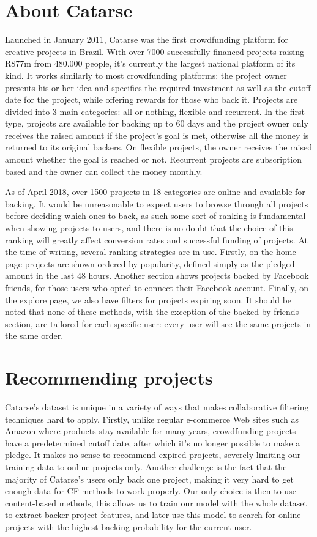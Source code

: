 \documentclass[cic,tc,english]{iiufrgs}
\begin{document}
\chapter{About Catarse}
Launched in January 2011, Catarse was the first crowdfunding platform for creative projects in Brazil. With over 7000 successfully financed projects raising R\$77m from 480.000 people, it's currently the largest national platform of its kind. It works similarly to most crowdfunding platforms: the project owner presents his or her idea and specifies the required investment as well as the cutoff date for the project, while offering rewards for those who back it. Projects are divided into 3 main categories: all-or-nothing, flexible and recurrent. In the first type, projects are available for backing up to 60 days and the project owner only receives the raised amount if the project's goal is met, otherwise all the money is returned to its original backers. On flexible projects, the owner receives the raised amount whether the goal is reached or not. Recurrent projects are subscription based and the owner can collect the money monthly.

As of April 2018, over 1500 projects in 18 categories are online and available for backing. It would be unreasonable to expect users to browse through all projects before deciding which ones to back, as such some sort of ranking is fundamental when showing projects to users, and there is no doubt that the choice of this ranking will greatly affect conversion rates and successful funding of projects. At the time of writing, several ranking strategies are in use. Firstly, on the home page projects are shown ordered by popularity, defined simply as the pledged amount in the last 48 hours. Another section shows projects backed by Facebook friends, for those users who opted to connect their Facebook account. Finally, on the explore page, we also have filters for projects expiring soon. It should be noted that none of these methods, with the exception of the backed by friends section, are tailored for each specific user: every user will see the same projects in the same order.

\chapter{Recommending projects}
Catarse's dataset is unique in a variety of ways that makes collaborative filtering techniques hard to apply. Firstly, unlike regular e-commerce Web sites such as Amazon where products stay available for many years, crowdfunding projects have a predetermined cutoff date, after which it's no longer possible to make a pledge. It makes no sense to recommend expired projects, severely limiting our training data to online projects only. Another challenge is the fact that the majority of Catarse's users only back one project, making it very hard to get enough data for CF methods to work properly. Our only choice is then to use content-based methods, this allows us to train our model with the whole dataset to extract backer-project features, and later use this model to search for online projects with the highest backing probability for the current user.
\end{document}
